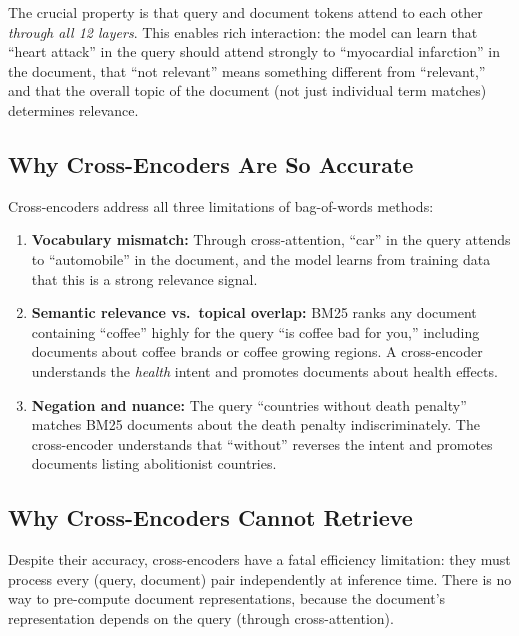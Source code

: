 \documentclass[11pt,a4paper]{article}
\theoremstyle{definition}
\theoremstyle{plain}
\begin{document}
The crucial property is that query and document tokens attend to each other \emph{through all 12 layers}. This enables rich interaction: the model can learn that ``heart attack'' in the query should attend strongly to ``myocardial infarction'' in the document, that ``not relevant'' means something different from ``relevant,'' and that the overall topic of the document (not just individual term matches) determines relevance.

\subsection{Why Cross-Encoders Are So Accurate}

Cross-encoders address all three limitations of bag-of-words methods:

\begin{enumerate}
    \item \textbf{Vocabulary mismatch:} Through cross-attention, ``car'' in the query attends to ``automobile'' in the document, and the model learns from training data that this is a strong relevance signal.
    
    \item \textbf{Semantic relevance vs.\ topical overlap:} BM25 ranks any document containing ``coffee'' highly for the query ``is coffee bad for you,'' including documents about coffee brands or coffee growing regions. A cross-encoder understands the \emph{health} intent and promotes documents about health effects.
    
    \item \textbf{Negation and nuance:} The query ``countries without death penalty'' matches BM25 documents about the death penalty indiscriminately. The cross-encoder understands that ``without'' reverses the intent and promotes documents listing abolitionist countries.
\end{enumerate}

\subsection{Why Cross-Encoders Cannot Retrieve}

Despite their accuracy, cross-encoders have a fatal efficiency limitation: they must process every (query, document) pair independently at inference time. There is no way to pre-compute document representations, because the document's representation depends on the query (through cross-attention).
\end{document}
